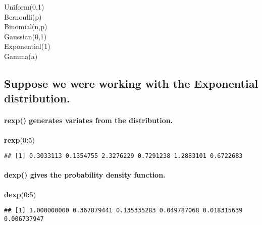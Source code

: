 \documentclass[
]{article}
\newenvironment{Shaded}{\begin{snugshade}}{\end{snugshade}}
\newcommand{\DecValTok}[1]{\textcolor[rgb]{0.00,0.00,0.81}{#1}}
\newcommand{\FunctionTok}[1]{\textcolor[rgb]{0.13,0.29,0.53}{\textbf{#1}}}
\newcommand{\NormalTok}[1]{#1}
\newcommand{\SpecialCharTok}[1]{\textcolor[rgb]{0.81,0.36,0.00}{\textbf{#1}}}
\begin{document}
Uniform(0,1)\\
Bernoulli(p)\\
Binomial(n,p)\\
Gaussian(0,1)\\
Exponential(1)\\
Gamma(a)\\

\subsection{Suppose we were working with the Exponential
distribution.}\label{suppose-we-were-working-with-the-exponential-distribution.}

\paragraph{rexp() generates variates from the
distribution.}\label{rexp-generates-variates-from-the-distribution.}

\begin{Shaded}
\begin{Highlighting}[]
\FunctionTok{rexp}\NormalTok{(}\DecValTok{0}\SpecialCharTok{:}\DecValTok{5}\NormalTok{)}
\end{Highlighting}
\end{Shaded}

\begin{verbatim}
## [1] 0.3033113 0.1354755 2.3276229 0.7291238 1.2883101 0.6722683
\end{verbatim}

\paragraph{dexp() gives the probability density
function.}\label{dexp-gives-the-probability-density-function.}

\begin{Shaded}
\begin{Highlighting}[]
\FunctionTok{dexp}\NormalTok{(}\DecValTok{0}\SpecialCharTok{:}\DecValTok{5}\NormalTok{)}
\end{Highlighting}
\end{Shaded}

\begin{verbatim}
## [1] 1.000000000 0.367879441 0.135335283 0.049787068 0.018315639 0.006737947
\end{verbatim}
\end{document}
